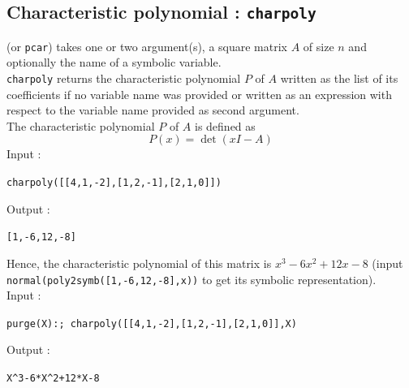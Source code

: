 \documentclass[a4paper,11pt]{book}
\begin{document}
\subsection{Characteristic polynomial : {\tt charpoly}}
 (or {\tt pcar}) takes one or two argument(s),
 a square matrix $A$ of size $n$ and optionally
the name of a symbolic variable.\\
{\tt charpoly} returns the characteristic polynomial 
$P$ of $A$ written as the
list of its coefficients if no variable name was provided
or written as an expression with respect to
the variable name provided as second argument.\\
The characteristic polynomial $P$ of $A$ is defined as
\[ P(x)=\det(x I-A) \]
Input :
\begin{center}{\tt charpoly([[4,1,-2],[1,2,-1],[2,1,0]])}\end{center}
Output :
\begin{center}{\tt[1,-6,12,-8]}\end{center}
Hence, the characteristic polynomial of this matrix is
$x^3-6x^2+12x-8$ (input {\tt normal(poly2symb([1,-6,12,-8],x))} to get
its symbolic representation).\\
Input :
\begin{center}{\tt purge(X):;
charpoly([[4,1,-2],[1,2,-1],[2,1,0]],X)}\end{center}
Output :
\begin{center}{\tt X\verb|^|3-6*X\verb|^|2+12*X-8}\end{center}
\end{document}
